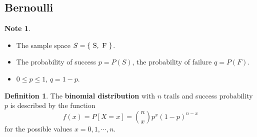 \documentclass[12pt,openany]{book}
\theoremstyle{definition}
\newtheorem{definition}{Definition}[chapter]
\newtheorem*{note}{Note}
\begin{document}
	\newpage
	\subsection{Bernoulli}
	\begin{note}
		\ \begin{itemize}
			\item The sample space $S = \set{\ \text{S},\ \text{F}\ }$.
			\item The probability of success $p=P(S)$, the probability of failure $q=P(F)$.
			\item $0\leq p\leq 1$, $q=1-p$.
		\end{itemize}
	\end{note}
	\vspace{20pt}
	\begin{tcolorbox}[colback=white,colframe=defcolor,arc=5pt,title={\color{white}\bf Binomial Distribution}]
		\begin{definition}
			The \textbf{binomial distribution} with $n$ trails and success probability $p$ is described by the function \[
			f(x) = P[X=x] = \binom{n}{x}p^x(1-p)^{n-x}
			\] for the possible values $x = 0, 1, \cdots, n$.
		\end{definition}
	\end{tcolorbox}
\end{document}
